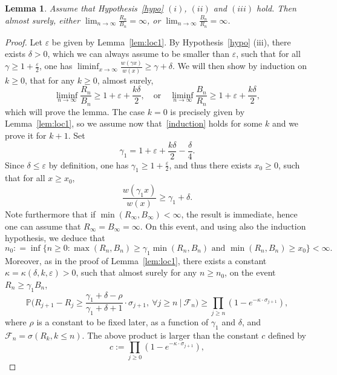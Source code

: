 \documentclass[10pt,a4paper]{amsart}
\newtheorem {lem} {Lemma} [section]
\newcommand{\1}{{\text{\Large $\mathfrak 1$}}}
\begin{document}
\begin{lem}\label{lem:loc2}
Assume that Hypothesis~\ref{hypo} $(i)$, $(ii)$ and $(iii)$ hold. Then almost surely, 
either $\lim_{n\to \infty} \frac{R_n}{B_n}= \infty$, or $\lim_{n\to \infty}\frac{B_n}{R_n} =  \infty$. 
\end{lem}
\begin{proof}
Let $\varepsilon$ be given by Lemma~\ref{lem:loc1}. By Hypothesis~\ref{hypo} (iii), there exists $\delta>0$, which we can always assume to be smaller than $\varepsilon$, such that for all $\gamma\ge 1+\frac{\varepsilon}{2}$, one has 
$\liminf_{x\to \infty}\frac{w(\gamma x)}{w(x)} \ge \gamma + \delta$. 
We will then show by induction on $k\ge 0$, that for any $k\ge 0$, almost surely, 
\begin{equation}\label{induction}
\liminf_{n\to \infty} \frac{R_n}{B_n}\ge 1+\varepsilon + \frac{k\delta}{2}, \quad \text{or} \quad \liminf_{n\to \infty} \frac{B_n}{R_n}\ge 1+\varepsilon + \frac{k\delta}{2},  
\end{equation}
which will prove the lemma.  The case $k=0$ is precisely given by Lemma~\ref{lem:loc1}, so we assume now that~\eqref{induction} holds for some $k$ and we prove it for $k+1$. Set 
$$\gamma_1 = 1+ \varepsilon + \frac{k\delta}{2}-\frac{\delta}{4}.$$
Since $\delta\le \varepsilon$ by definition, one has $\gamma_1\ge 1+ \frac{\varepsilon}{2}$, and thus there exists $x_0\ge 0$, such that for all $x\ge x_0$, 
$$\frac{w(\gamma_1 x)}{w(x)} \ge \gamma_1 + \delta.$$
Note furthermore that if $ \min(R_\infty,B_\infty)<\infty$, the result is immediate, hence one can assume that $R_\infty = B_\infty = \infty$. 
On this event, and using also the induction hypothesis, we deduce that 
$$n_0 : =  \inf \big\{ n\ge 0 : \max(R_n,B_n) \ge \gamma_1 \min(R_n,B_n) \text{ and } \min(R_n,B_n)  \ge x_0\big\} <\infty. $$ 
Moreover, as in the proof of Lemma~\ref{lem:loc1}, there exists a constant $\kappa=\kappa(\delta,k,\varepsilon)>0$, such that almost surely for any $n\ge n_0$, 
on the event $ R_n\ge \gamma_1 B_n$, 
\begin{equation}\label{induction.accroissements}
\mathbb P\Big(R_{j+1} - R_j \ge \frac{\gamma_1 + \delta-\rho}{\gamma_1 + \delta+1} \cdot \sigma_{j+1}, \ \forall j\ge n\ \Big|\ \mathcal F_n\Big)\ge \prod_{j\ge n} (1- e^{-\kappa \cdot\sigma_{j+1}}), 
\end{equation}
where $\rho$ is a constant to be fixed later, as a function of $\gamma_1$ and $\delta$, and $\mathcal F_n = \sigma(R_k,k\le n)$. 
The above product is larger than the constant $c$ defined by 
$$c:= \prod_{j\ge 0}  (1- e^{-\kappa \cdot\sigma_{j+1}}),$$

\end{proof}
\end{document}
